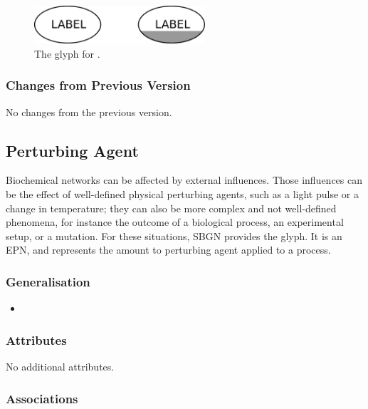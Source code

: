 \begin{figure}[H]
  \centering
  \includegraphics[width=2.5in]{images/unspecified}
  \caption{The \PD glyph for .}
  \label{fig:unspecified}
\end{figure}

\subsubsection{Changes from Previous Version}

No changes from the previous version.

\subsection{Perturbing Agent}
\label{sec:perturbing agent}

Biochemical networks can be affected by external influences.  Those
influences can be the effect of well-defined physical perturbing
agents, such as a light pulse or a change in temperature; they can
also be more complex and not well-defined phenomena, for instance the
outcome of a biological process, an experimental setup, or a mutation.
For these situations, SBGN provides the 
glyph. It is an EPN, and represents the amount to perturbing agent
applied to a process.

\subsubsection{Generalisation}

\begin{itemize}
\item {}
\end{itemize}

\subsubsection{Attributes}

No additional attributes.

\subsubsection{Associations}

